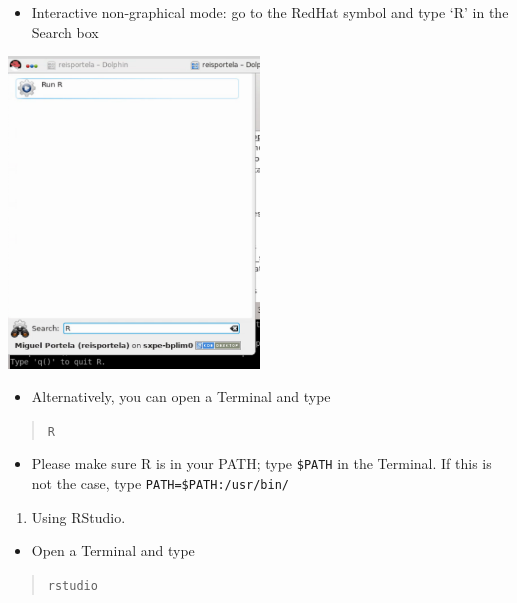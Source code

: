 \documentclass[
  11pt,
  a4paper,
]{article}
\providecommand{\tightlist}{%
  \setlength{\itemsep}{0pt}\setlength{\parskip}{0pt}}
\begin{document}
\begin{itemize}
\tightlist
\item
  Interactive non-graphical mode: go to the RedHat symbol and type `R'
  in the Search box
\end{itemize}

\includegraphics[width=0.5\textwidth,height=\textheight]{./media/CallR.png}

\begin{itemize}
\tightlist
\item
  Alternatively, you can open a Terminal and type
\end{itemize}

\begin{quote}
\texttt{R}
\end{quote}

\begin{itemize}
\tightlist
\item
  Please make sure R is in your PATH; type \texttt{\$PATH} in the
  Terminal. If this is not the case, type \texttt{PATH=\$PATH:/usr/bin/}
\end{itemize}

\begin{enumerate}
\def\labelenumi{\arabic{enumi}.}
\setcounter{enumi}{1}
\tightlist
\item
  Using RStudio.
\end{enumerate}

\begin{itemize}
\tightlist
\item
  Open a Terminal and type
\end{itemize}

\begin{quote}
\texttt{rstudio}
\end{quote}
\end{document}
